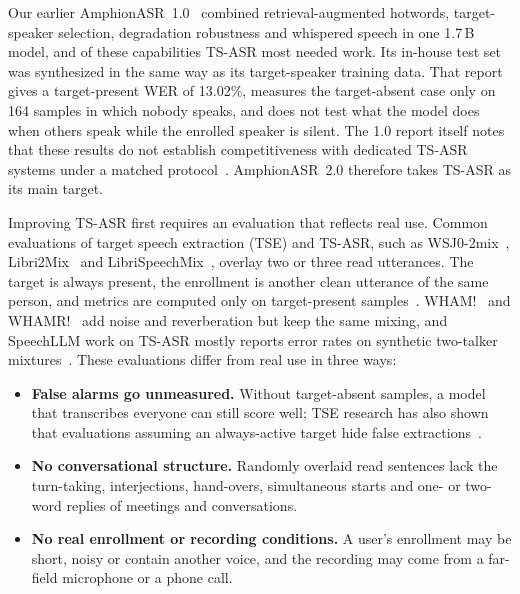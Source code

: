 Our earlier AmphionASR~1.0~\cite{amphion2026amphionasr} combined retrieval-augmented hotwords, target-speaker selection, degradation robustness and whispered speech in one 1.7\,B model, and of these capabilities TS-ASR most needed work.
Its in-house test set was synthesized in the same way as its target-speaker training data.
That report gives a target-present WER of 13.02\%, measures the target-absent case only on 164 samples in which nobody speaks, and does not test what the model does when others speak while the enrolled speaker is silent.
The 1.0 report itself notes that these results do not establish competitiveness with dedicated TS-ASR systems under a matched protocol~\cite{amphion2026amphionasr}.
AmphionASR~2.0 therefore takes TS-ASR as its main target.

Improving TS-ASR first requires an evaluation that reflects real use.
Common evaluations of target speech extraction (TSE) and TS-ASR, such as WSJ0-2mix~\cite{hershey2016deep}, Libri2Mix~\cite{cosentino2020librimix} and LibriSpeechMix~\cite{kanda2020serialized}, overlay two or three read utterances.
The target is always present, the enrollment is another clean utterance of the same person, and metrics are computed only on target-present samples~\cite{zmolikova2019speakerbeam, zmolikova2023neural}.
WHAM!~\cite{wichern2019wham} and WHAMR!~\cite{maciejewski2020whamr} add noise and reverberation but keep the same mixing, and SpeechLLM work on TS-ASR mostly reports error rates on synthetic two-talker mixtures~\cite{zhang2025thinking, guo2024sqwhisper}.
These evaluations differ from real use in three ways:
\begin{itemize}[leftmargin=*, itemsep=2pt]
  \item \textbf{False alarms go unmeasured.} Without target-absent samples, a model that transcribes everyone can still score well; TSE research has also shown that evaluations assuming an always-active target hide false extractions~\cite{delcroix2022listen}.
  \item \textbf{No conversational structure.} Randomly overlaid read sentences lack the turn-taking, interjections, hand-overs, simultaneous starts and one- or two-word replies of meetings and conversations.
  \item \textbf{No real enrollment or recording conditions.} A user's enrollment may be short, noisy or contain another voice, and the recording may come from a far-field microphone or a phone call.
\end{itemize}

